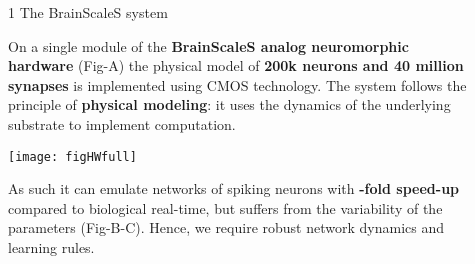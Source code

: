 \newcommand{\blockSpaceOne}{\vspace{1.3cm}}
\newcommand{\interBlockSpaceOne}{\vspace{1.5cm}}
\newcommand{\blockSpaceTwo}{\vspace{1.3cm}}
\newcommand{\interBlockSpaceTwo}{\vspace{.95cm}}
\newcommand{\secondBlockImSpace}{\vspace{.25cm}}
\newcommand{\thirdBlockImSpace}{\vspace{1.125cm}}

\begin{frame} %
	\vspace{-.5cm}
	\begin{columns}
		\begin{column}{.005\textwidth}\end{column}

		
		\begin{column}{0.99\textwidth}
			\begin{columns}[t]

				\begin{column}{.01\textwidth}\end{column}

				\begin{column}{0.32\textwidth}


					\begin{block}{\large 1 The BrainScaleS system}
					\blockSpaceOne


					\justifying
					\begin{adjustwidth}{1.cm}{1.cm}
					 On a single module of the \textbf{BrainScaleS \cite{schemmel2010wafer} analog neuromorphic hardware} (Fig-A) the physical model of \textbf{200k neurons and 40 million synapses} is implemented using CMOS technology.
					 The system follows the principle of \textbf{physical modeling}: it uses the dynamics of the underlying substrate to implement computation.
					 
					\end{adjustwidth}

					\vspace{1.cm}
					\begin{center}
						\texttt{[image: figHWfull]}
					\end{center}

					\begin{adjustwidth}{1cm}{1cm}
					As such it can emulate networks of spiking neurons with \textbf{-fold speed-up} compared to biological real-time, but suffers from the variability of the parameters (Fig-B-C).
					Hence, we require robust network dynamics and learning rules.


\end{adjustwidth}
\end{block}
\end{column}
\end{columns}
\end{column}
\end{columns}
\end{frame}
